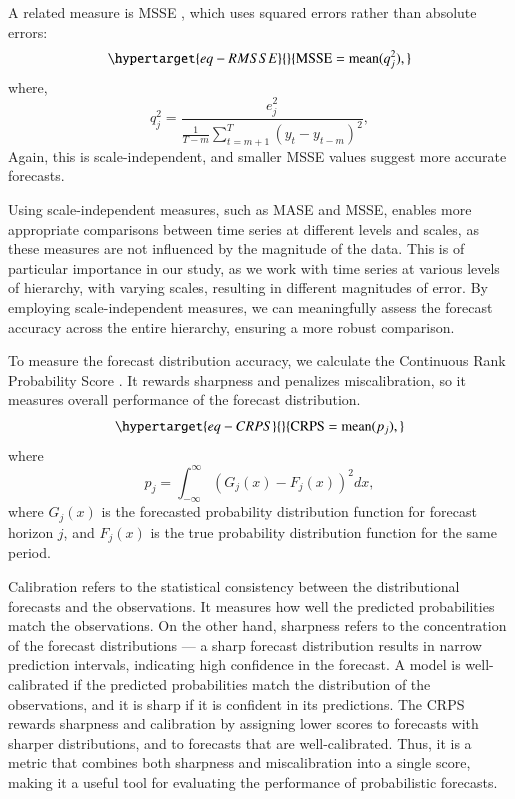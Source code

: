 \documentclass[
  authoryear,
  preprint,
  3p]{elsarticle}
\begin{document}
A related measure is MSSE
\citep{hyndman2021forecasting, makridakis2022m5}, which uses squared
errors rather than absolute errors:
\begin{equation}\protect\hypertarget{eq-RMSSE}{}{
  \text{MSSE} = \text{mean}(q_{j}^2),
}\label{eq-RMSSE}\end{equation} where, \[
  q^2_{j} = \frac{ e^2_{j}}
 {\displaystyle\frac{1}{T-m}\sum_{t=m+1}^T (y_{t}-y_{t-m})^2},
\] Again, this is scale-independent, and smaller MSSE values suggest
more accurate forecasts.

Using scale-independent measures, such as MASE and MSSE, enables more
appropriate comparisons between time series at different levels and
scales, as these measures are not influenced by the magnitude of the
data. This is of particular importance in our study, as we work with
time series at various levels of hierarchy, with varying scales,
resulting in different magnitudes of error. By employing
scale-independent measures, we can meaningfully assess the forecast
accuracy across the entire hierarchy, ensuring a more robust comparison.

To measure the forecast distribution accuracy, we calculate the
Continuous Rank Probability Score
\citep{gneiting2014probabilistic, hyndman2021forecasting}. It rewards
sharpness and penalizes miscalibration, so it measures overall
performance of the forecast distribution.
\begin{equation}\protect\hypertarget{eq-CRPS}{}{
  \text{CRPS} = \text{mean}(p_j),
}\label{eq-CRPS}\end{equation} where \[
  p_j = \int_{-\infty}^{\infty} \left(G_j(x) - F_j(x)\right)^2dx,
\] where \(G_j(x)\) is the forecasted probability distribution function
for forecast horizon \(j\), and \(F_j(x)\) is the true probability
distribution function for the same period.

Calibration refers to the statistical consistency between the
distributional forecasts and the observations. It measures how well the
predicted probabilities match the observations. On the other hand,
sharpness refers to the concentration of the forecast distributions ---
a sharp forecast distribution results in narrow prediction intervals,
indicating high confidence in the forecast. A model is well-calibrated
if the predicted probabilities match the distribution of the
observations, and it is sharp if it is confident in its predictions. The
CRPS rewards sharpness and calibration by assigning lower scores to
forecasts with sharper distributions, and to forecasts that are
well-calibrated. Thus, it is a metric that combines both sharpness and
miscalibration into a single score, making it a useful tool for
evaluating the performance of probabilistic forecasts.
\end{document}
